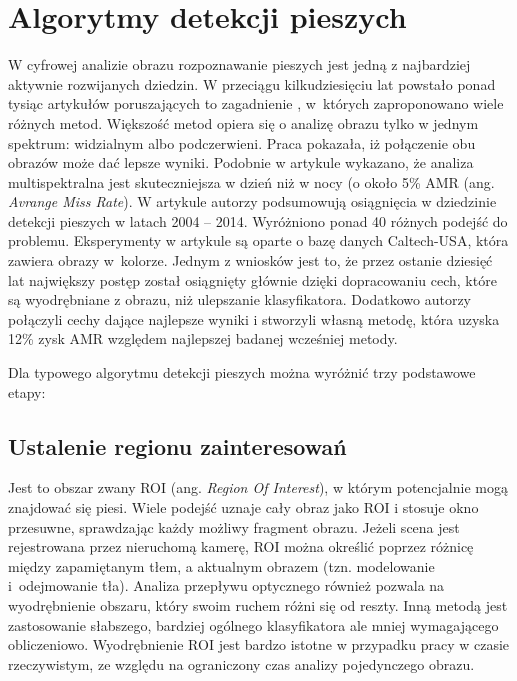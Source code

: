 \chapter{Algorytmy detekcji pieszych}
\label{cha:algoDetPiesz}

W cyfrowej analizie obrazu rozpoznawanie pieszych jest jedną z najbardziej aktywnie rozwijanych dziedzin. 
W przeciągu kilkudziesięciu lat powstało ponad tysiąc artykułów poruszających to zagadnienie \cite{zhang2015filtered}, w~których zaproponowano wiele różnych metod. 
Większość metod opiera się o analizę obrazu tylko w jednym spektrum: widzialnym albo podczerwieni. 
Praca \cite{hwang2015multispectral} pokazała, iż połączenie obu obrazów może dać lepsze wyniki. 
Podobnie w artykule \cite{gonzalez2016pedestrian} wykazano, że analiza multispektralna jest skuteczniejsza w dzień niż w nocy (o około 5\% AMR (ang. \textit{Avrange Miss Rate}). 
W artykule \cite{benenson2014ten} autorzy podsumowują osiągnięcia w dziedzinie detekcji pieszych w latach 2004 -- 2014. 
Wyróżniono ponad 40 różnych podejść do problemu. 
Eksperymenty w artykule są oparte o bazę danych Caltech-USA, która zawiera obrazy w~kolorze. 
Jednym z wniosków jest to, że przez ostanie dziesięć lat największy postęp został osiągnięty głównie dzięki dopracowaniu cech, które są wyodrębniane z obrazu, niż ulepszanie klasyfikatora. 
Dodatkowo autorzy połączyli cechy dające najlepsze wyniki i stworzyli własną metodę, która uzyska 12\% zysk AMR względem najlepszej badanej wcześniej metody.


Dla typowego algorytmu detekcji pieszych można wyróżnić trzy podstawowe etapy:

\section{Ustalenie regionu zainteresowań} 

Jest to obszar zwany ROI (ang. \textit{Region Of Interest}), w którym potencjalnie mogą znajdować się piesi. 
Wiele podejść uznaje cały obraz jako ROI i stosuje okno przesuwne, sprawdzając każdy możliwy fragment obrazu. 
Jeżeli scena jest rejestrowana przez nieruchomą kamerę, ROI można określić poprzez różnicę między zapamiętanym tłem, a aktualnym obrazem (tzn. modelowanie i~odejmowanie tła). Analiza przepływu optycznego również pozwala na wyodrębnienie obszaru, który swoim ruchem różni się od reszty. Inną metodą jest zastosowanie słabszego, bardziej ogólnego klasyfikatora ale mniej wymagającego obliczeniowo.
Wyodrębnienie ROI jest bardzo istotne w przypadku pracy w czasie rzeczywistym, ze względu na ograniczony czas analizy pojedynczego obrazu.

